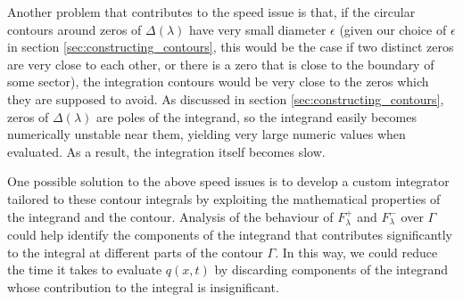 \documentclass[12pt, oneside, a4paper]{article}
\begin{document}
Another problem that contributes to the speed issue is that, if the circular contours around zeros of $\Delta(\lambda)$ have very small diameter $\epsilon$ (given our choice of $\epsilon$ in section \ref{sec:constructing_contours}, this would be the case if two distinct zeros are very close to each other, or there is a zero that is close to the boundary of some sector), the integration contours would be very close to the zeros which they are supposed to avoid. As discussed in section \ref{sec:constructing_contours}, zeros of $\Delta(\lambda)$ are poles of the integrand, so the integrand easily becomes numerically unstable near them, yielding very large numeric values when evaluated. As a result, the integration itself becomes slow.

One possible solution to the above speed issues is to develop a custom integrator tailored to these contour integrals by exploiting the mathematical properties of the integrand and the contour. Analysis of the behaviour of $F_\lambda^+$ and $F_\lambda^-$ over $\Gamma$ could help identify the components of the integrand that contributes significantly to the integral at different parts of the contour $\Gamma$. In this way, we could reduce the time it takes to evaluate $q(x,t)$ by discarding components of the integrand whose contribution to the integral is insignificant.

\newpage
{}

\newpage

% 

\end{document}
